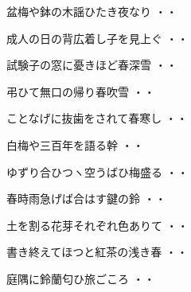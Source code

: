 \begin{shiika}盆梅や鉢の木謡ひたき夜なり
\hfill{・・}\end{shiika}
\vspace{0.6cm}
\begin{shiika}成人の日の背広着し子を見上ぐ
\hfill{・・}\end{shiika}
\vspace{0.6cm}
\begin{shiika}試験子の窓に憂きほど春深雪
\hfill{・・}\end{shiika}
\vspace{0.6cm}
\begin{shiika}弔ひて無口の帰り春吹雪
\hfill{・・}\end{shiika}
\vspace{0.6cm}
\begin{shiika}ことなげに抜歯をされて春寒し
\hfill{・・}\end{shiika}
\vspace{0.6cm}
\begin{shiika}白梅や三百年を語る幹
\hfill{・・}\end{shiika}
\vspace{0.6cm}
\begin{shiika}ゆずり合ひつヽ空うばひ梅盛る
\hfill{・・}\end{shiika}
\vspace{0.6cm}
\begin{shiika}春時雨急げば合はす鍵の鈴
\hfill{・・}\end{shiika}
\vspace{0.6cm}
\begin{shiika}土を割る花芽それぞれ色ありて
\hfill{・・}\end{shiika}
\vspace{0.6cm}
\begin{shiika}書き終えてほつと紅茶の浅き春
\hfill{・・}\end{shiika}
\vspace{0.6cm}
\begin{shiika}庭隅に鈴蘭匂ひ旅ごころ
\hfill{・・}\end{shiika}
\vspace{0.6cm}
